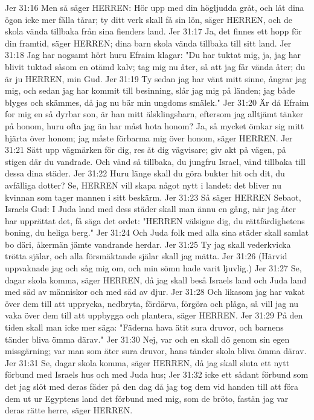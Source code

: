 Jer 31:16  Men så säger HERREN: Hör upp med din högljudda gråt, och låt dina ögon icke mer fälla tårar; ty ditt verk skall få sin lön, säger HERREN, och de skola vända tillbaka från sina fienders land.
Jer 31:17  Ja, det finnes ett hopp för din framtid, säger HERREN; dina barn skola vända tillbaka till sitt land.
Jer 31:18  Jag har nogsamt hört huru Efraim klagar: "Du har tuktat mig, ja, jag har blivit tuktad såsom en otämd kalv; tag mig nu åter, så att jag får vända åter; du är ju HERREN, min Gud.
Jer 31:19  Ty sedan jag har vänt mitt sinne, ångrar jag mig, och sedan jag har kommit till besinning, slår jag mig på länden; jag både blyges och skämmes, då jag nu bär min ungdoms smälek."
Jer 31:20  Är då Efraim for mig en så dyrbar son, är han mitt älsklingsbarn, eftersom jag alltjämt tänker på honom, huru ofta jag än har måst hota honom? Ja, så mycket ömkar sig mitt hjärta över honom; jag måste förbarma mig över honom, säger HERREN.
Jer 31:21  Sätt upp vägmärken för dig, res åt dig vägvisare; giv akt på vägen, på stigen där du vandrade. Och vänd så tillbaka, du jungfru Israel, vänd tillbaka till dessa dina städer.
Jer 31:22  Huru länge skall du göra bukter hit och dit, du avfälliga dotter? Se, HERREN vill skapa något nytt i landet: det bliver nu kvinnan som tager mannen i sitt beskärm.
Jer 31:23  Så säger HERREN Sebaot, Israels Gud: I Juda land med dess städer skall man ännu en gång, när jag åter har upprättat det, få säga det ordet: "HERREN välsigne dig, du rättfärdighetens boning, du heliga berg."
Jer 31:24  Och Juda folk med alla sina städer skall samlat bo däri, åkermän jämte vandrande herdar.
Jer 31:25  Ty jag skall vederkvicka trötta själar, och alla försmäktande själar skall jag mätta.
Jer 31:26  (Härvid uppvaknade jag och såg mig om, och min sömn hade varit ljuvlig.)
Jer 31:27  Se, dagar skola komma, säger HERREN, då jag skall beså Israels land och Juda land med säd av människor och med säd av djur.
Jer 31:28  Och likasom jag har vakat över dem till att upprycka, nedbryta, fördärva, förgöra och plåga, så vill jag nu vaka över dem till att uppbygga och plantera, säger HERREN.
Jer 31:29  På den tiden skall man icke mer säga: "Fäderna hava ätit sura druvor, och barnens tänder bliva ömma därav."
Jer 31:30  Nej, var och en skall dö genom sin egen missgärning; var man som äter sura druvor, hans tänder skola bliva ömma därav.
Jer 31:31  Se, dagar skola komma, säger HERREN, då jag skall sluta ett nytt förbund med Israels hus och med Juda hus;
Jer 31:32  icke ett sådant förbund som det jag slöt med deras fäder på den dag då jag tog dem vid handen till att föra dem ut ur Egyptens land det förbund med mig, som de bröto, fastän jag var deras rätte herre, säger HERREN.
